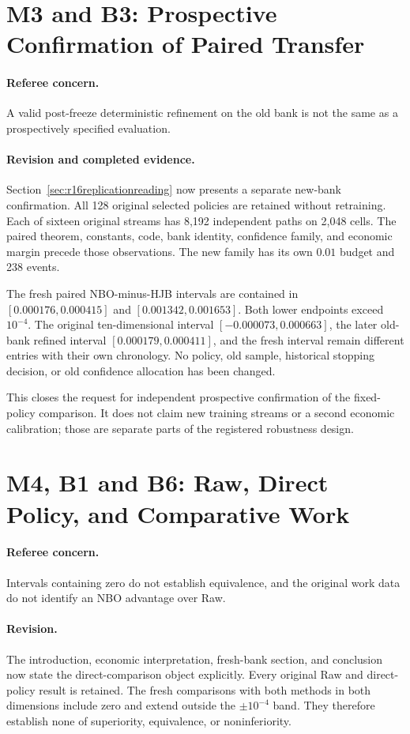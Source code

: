 \section{M3 and B3: Prospective Confirmation of Paired Transfer}
\paragraph*{Referee concern.} A valid post-freeze deterministic refinement on the old bank is not the same as a prospectively specified evaluation.

\paragraph*{Revision and completed evidence.} Section~\ref{sec:r16replicationreading} now presents a separate new-bank confirmation. All 128 original selected policies are retained without retraining. Each of sixteen original streams has 8,192 independent paths on 2,048 cells. The paired theorem, constants, code, bank identity, confidence family, and economic margin precede those observations. The new family has its own $0.01$ budget and 238 events.

The fresh paired NBO-minus-HJB intervals are contained in $[0.000176,0.000415]$ and $[0.001342,0.001653]$. Both lower endpoints exceed $10^{-4}$. The original ten-dimensional interval $[-0.000073,0.000663]$, the later old-bank refined interval $[0.000179,0.000411]$, and the fresh interval remain different entries with their own chronology. No policy, old sample, historical stopping decision, or old confidence allocation has been changed.

This closes the request for independent prospective confirmation of the fixed-policy comparison. It does not claim new training streams or a second economic calibration; those are separate parts of the registered robustness design.

\section{M4, B1 and B6: Raw, Direct Policy, and Comparative Work}
\paragraph*{Referee concern.} Intervals containing zero do not establish equivalence, and the original work data do not identify an NBO advantage over Raw.

\paragraph*{Revision.} The introduction, economic interpretation, fresh-bank section, and conclusion now state the direct-comparison object explicitly. Every original Raw and direct-policy result is retained. The fresh comparisons with both methods in both dimensions include zero and extend outside the $\pm10^{-4}$ band. They therefore establish none of superiority, equivalence, or noninferiority.

